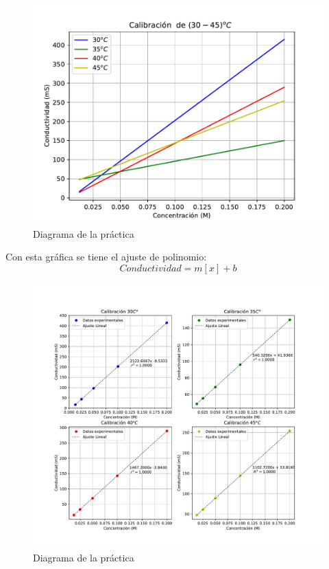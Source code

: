 \begin{enumerate}
        \begin{figure}[H]
            \centering
            \includegraphics[scale = 0.8]{Figuras/calibracion_todos.pdf}
            \caption{Diagrama de la pr\'{a}ctica}
        \end{figure}

    Con esta gráfica se tiene el ajuste de polinomio:
            $$  Conductividad = m[x] + b$$

        \begin{figure}[H]
            \centering
            \includegraphics[scale=0.65]{Figuras/FiguraTodos.pdf}
            \caption{Diagrama de la pr\'{a}ctica}
        \end{figure}


\end{enumerate}
